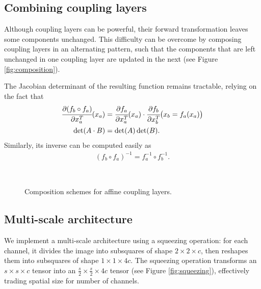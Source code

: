 \documentclass{article}
\begin{document}
\subsection{Combining coupling layers}
Although coupling layers can be powerful, their forward transformation leaves some components unchanged.
This difficulty can be overcome by composing coupling layers in an alternating pattern, such that the components that are left unchanged in one coupling layer are updated in the next (see Figure \ref{fig:composition}).

The Jacobian determinant of the resulting function remains tractable, relying on the fact that
\begin{align}
\cfrac{\partial (f_{b} \circ f_{a})}{\partial x_{a}^{T}}(x_{a}) &= \cfrac{\partial f_{a}}{\partial x_{a}^{T}}(x_{a}) \cdot \cfrac{\partial f_{b}}{\partial x_{b}^{T}}\big(x_{b}=f_{a}(x_{a})\big) \\
\det(A \cdot B) &= \det(A) \det(B).
\end{align}
Similarly, its inverse can be computed easily as
\begin{align}
(f_{b} \circ f_{a})^{-1} = f_{a}^{-1} \circ f_{b}^{-1}.
\end{align}
\begin{figure}[h]
\centering {} ~~~~~~
    \caption{Composition schemes for affine coupling layers.}
\end{figure}



\subsection{Multi-scale architecture}
\label{section:multiscale}
We implement a multi-scale architecture using a squeezing operation: for each channel, it divides the image into subsquares of shape $2 \times 2 \times c$, then reshapes them into subsquares of shape $1 \times 1 \times 4c$. The squeezing operation transforms an $s \times s \times c$ tensor into an $\frac{s}{2} \times \frac{s}{2} \times 4c$ tensor (see Figure  \ref{fig:squeezing}), effectively trading spatial size for number of channels.
\end{document}
